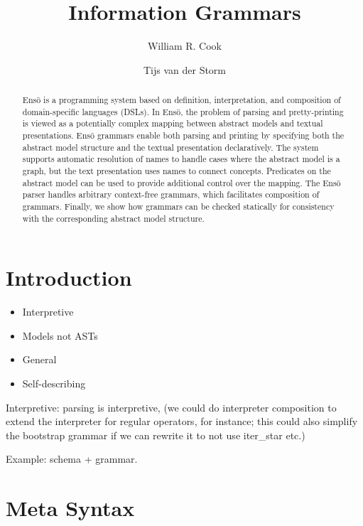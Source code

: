 \documentclass[a4paper]{article}
\def\enso{Ens\={o}\xspace}
\begin{document}
\title{Information Grammars} %
\author[1]{William R. Cook} 
\author[2]{Tijs van der Storm}
\maketitle

\begin{abstract}
  \enso is a programming system based on definition, interpretation, and composition of
  domain-specific languages (DSLs). In \enso, the problem of parsing and pretty-printing
  is viewed as a potentially complex mapping between abstract models and textual presentations.
  \enso grammars enable both parsing and printing by specifying both the abstract model
  structure and the textual presentation declaratively. The system supports automatic
  resolution of names to handle cases where the abstract model is a graph, but the 
  text presentation uses names to connect concepts. Predicates on the abstract model 
  can be used to provide additional control over the mapping. The \enso parser handles arbitrary
  context-free grammars, which facilitates composition of grammars. 
  Finally, we show how grammars can be checked statically for consistency with the
  corresponding abstract model structure.
\end{abstract}

\section{Introduction}


\begin{itemize}
\item Interpretive
\item Models not ASTs
\item General
\item Self-describing
\end{itemize}

Interpretive: parsing is interpretive, (we could do interpreter
composition to extend the interpreter for regular operators, for
instance; this could also simplify the bootstrap grammar if we can
rewrite it to not use iter\_star etc.)

Example: schema + grammar.

\section{Meta Syntax}
\end{document}
